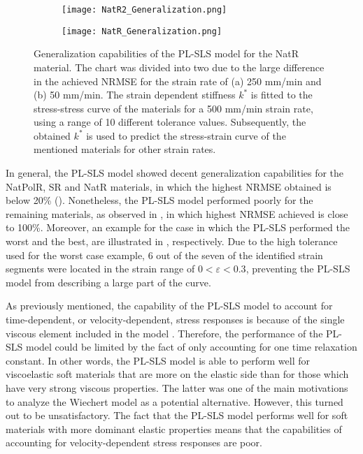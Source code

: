 \begin{figure}[htb!]
	\centering
    \begin{subfigure}[b]{0.49\textwidth}
        \centering
        \texttt{[image: NatR2\_Generalization.png]}
        \caption{}
        \label{fig:GenNatR2}
    \end{subfigure}
    \begin{subfigure}[b]{0.49\textwidth}
        \centering
        \texttt{[image: NatR\_Generalization.png]}
        \caption{}
        \label{fig:GenNatR1}
    \end{subfigure}
    \caption{Generalization capabilities of the PL-SLS model for the NatR material. The chart was divided into two due to the large difference in the achieved NRMSE for the strain rate of (a) 250 mm/min and (b) 50 mm/min. The strain dependent stiffness $k^*$ is fitted to the stress-stress curve of the materials for a 500 mm/min strain rate, using a range of 10 different tolerance values. Subsequently, the obtained $k^*$ is used to predict the stress-strain curve of the mentioned materials for other strain rates.}
    \label{fig:GenOtherAll}
\end{figure}

In general, the PL-SLS model showed decent generalization capabilities for the NatPolR, SR and NatR materials, in which the highest NRMSE obtained is below 20\% (). Nonetheless, the PL-SLS model performed poorly for the remaining materials, as observed in , in which highest NRMSE achieved is close to 100\%. Moreover, an example for the case in which the PL-SLS performed the worst and the best, are illustrated in , respectively. Due to the high tolerance used for the worst case example, 6 out of the seven of the identified strain segments were located in the strain range of $0 < \varepsilon < 0.3$, preventing the PL-SLS model from describing a large part of the curve.

As previously mentioned, the capability of the PL-SLS model to account for time-dependent, or velocity-dependent, stress responses is because of the single viscous element included in the model . Therefore, the performance of the PL-SLS model could be limited by the fact of only accounting for one time relaxation constant. In other words, the PL-SLS model is able to perform well for viscoelastic soft materials that are more on the elastic side than for those which have very strong viscous properties. The latter was one of the main motivations to analyze the Wiechert model as a potential alternative. However, this turned out to be unsatisfactory. The fact that the PL-SLS model performs well for soft materials with more dominant elastic properties means that the capabilities of accounting for velocity-dependent stress responses are poor.

